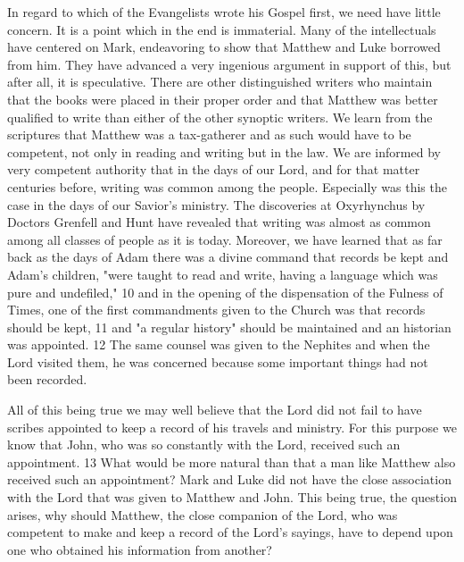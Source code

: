 In regard to which of the Evangelists wrote his Gospel first, we need have little concern. It is
a point which in the end is immaterial. Many of the intellectuals have centered on Mark,
endeavoring to show that Matthew and Luke borrowed from him. They have advanced a very
ingenious argument in support of this, but after all, it is speculative. There are other
distinguished writers who maintain that the books were placed in their proper order and that
Matthew was better qualified to write than either of the other synoptic writers. We learn from
the scriptures that Matthew was a tax-gatherer and as such would have to be competent, not
only in reading and writing but in the law. We are informed by very competent authority that
in the days of our Lord, and for that matter centuries before, writing was common among the
people. Especially was this the case in the days of our Savior's ministry. The discoveries at
Oxyrhynchus by Doctors Grenfell and Hunt have revealed that writing was almost as
common among all classes of people as it is today. Moreover, we have learned that as far
back as the days of Adam there was a divine command that records be kept and Adam's
children, "were taught to read and write, having a language which was pure and undefiled,"
10 and in the opening of the dispensation of the Fulness of Times, one of the first
commandments given to the Church was that records should be kept, 11 and "a regular
history" should be maintained and an historian was appointed. 12 The same counsel was
given to the Nephites and when the Lord visited them, he was concerned because some
important things had not been recorded.

All of this being true we may well believe that the Lord did not fail to have scribes appointed
to keep a record of his travels and ministry. For this purpose we know that John, who was so
constantly with the Lord, received such an appointment. 13 What would be more natural than
that a man like Matthew also received such an appointment? Mark and Luke did not have the
close association with the Lord that was given to Matthew and John. This being true, the
question arises, why should Matthew, the close companion of the Lord, who was competent
to make and keep a record of the Lord's sayings, have to depend upon one who obtained his
information from another?

